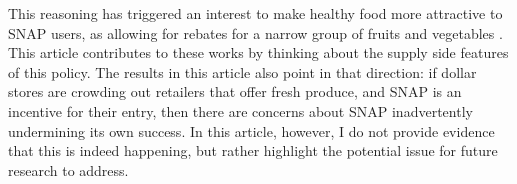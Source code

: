 \documentclass[11.5pt]{article}
\begin{document}
This reasoning has triggered an interest to make healthy food more attractive to SNAP users, as allowing for rebates for a narrow group of fruits and vegetables \cite{schanzenbach2017pros}. This article contributes to these works by thinking about the supply side features of this policy. The results in this article also point in that direction: if dollar stores are crowding out retailers that offer fresh produce, and SNAP is an incentive for their entry, then there are concerns about SNAP inadvertently undermining its own success. In this article, however, I do not provide evidence that this is indeed happening, but rather highlight the potential issue for future research to address.









\end{document}
